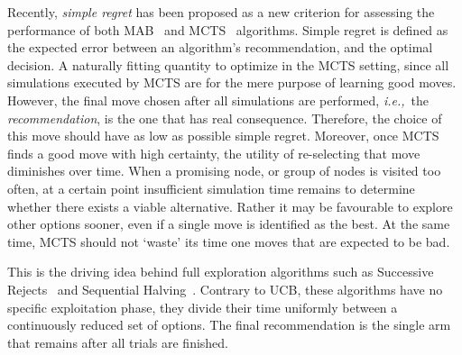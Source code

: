\documentclass{kecsmstr}
\newcommand{\ie}{{\it i.e.,}~}
\begin{document}
Recently, \emph{simple regret} has been proposed as a new criterion for assessing the performance of both MAB~ and MCTS~ algorithms. Simple regret is defined as the expected error between an algorithm's recommendation, and the optimal decision. A naturally fitting quantity to optimize in the MCTS setting, since all simulations executed by MCTS are for the mere purpose of learning good moves. However, the final move chosen after all simulations are performed, \ie the \emph{recommendation}, is the one that has real consequence. Therefore, the choice of this move should have as low as possible simple regret. Moreover, once MCTS finds a good move with high certainty, the utility of re-selecting that move diminishes over time. When a promising node, or group of nodes is visited too often, at a certain point insufficient simulation time remains to determine whether there exists a viable alternative. Rather it may be favourable to explore other options sooner, even if a single move is identified as the best. At the same time, MCTS should not `waste' its time one moves that are expected to be bad.

This is the driving idea behind full exploration algorithms such as Successive Rejects~ and Sequential Halving~. Contrary to UCB, these algorithms have no specific exploitation phase, they divide their time uniformly between a continuously reduced set of options. The final recommendation is the single arm that remains after all trials are finished.
\newpage
\end{document}
